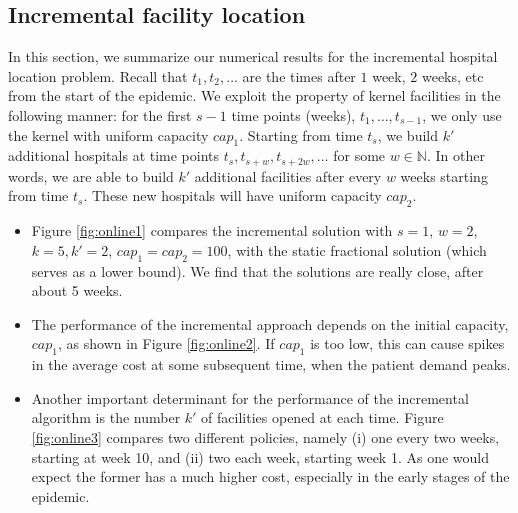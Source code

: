 \subsection*{Incremental facility location}
In this section, we summarize our numerical results for the incremental hospital location problem. Recall that $t_1, t_2, \ldots$ are the times after $1$ week, $2$ weeks, etc from the start of the epidemic. We exploit the property of kernel facilities in the following manner: for the first $s-1$ time points (weeks), $t_1, \ldots, t_{s-1}$, we only use the kernel with uniform capacity $cap_1$. Starting from time $t_{s}$, we build $k'$ additional hospitals at time points  $t_s, t_{s+w}, t_{s+2w}, \ldots$ for some $w \in \mathbb{N}$. In other words, we are able to build $k'$ additional facilities after every $w$ weeks starting from time $t_s$. These new hospitals will have uniform capacity $cap_2$.


\begin{itemize}
\item
Figure \ref{fig:online1} compares the incremental solution with 
$s=1$, $w=2$, $k=5, k' = 2$, $cap_1 = cap_2 = 100$, with the static fractional solution
(which serves as a lower bound). We find that the solutions are really close, after about 5 weeks.
\item
The performance of the incremental approach depends on the initial capacity, $cap_1$, as shown
in Figure \ref{fig:online2}. If $cap_1$ is too low, this can cause spikes in the average cost
at some subsequent time, when the patient demand peaks.
\item
Another important determinant for the performance of the incremental algorithm is the
number $k'$ of facilities opened at each time. Figure \ref{fig:online3} compares two different
policies, namely (i) one every two weeks, starting at week 10, and
(ii) two each week, starting week 1. As one would expect the former has a much
higher cost, especially in the early stages of the epidemic.
\end{itemize}

